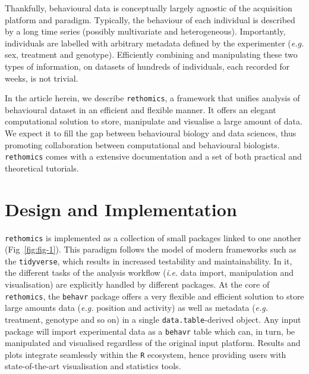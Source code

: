 \documentclass[10pt,letterpaper]{article}\usepackage[]{graphicx}\usepackage[]{color}
\begin{document}
Thankfully, behavioural data is conceptually largely agnostic of the acquisition platform and paradigm. 	
Typically, the behaviour of each individual is described by a long time series (possibly multivariate and heterogeneous).
Importantly, individuals are labelled with arbitrary metadata defined by the experimenter (\emph{e.g.} sex, treatment and genotype).
Efficiently combining and manipulating these two types of information, on datasets of hundreds of individuals, each recorded for weeks, is not trivial.

In the article herein, we describe \texttt{rethomics}, a framework that unifies analysis of behavioural dataset in an efficient and flexible manner.
It offers an elegant computational solution to store, manipulate and visualise a large amount of data.
We expect it to fill the gap between behavioural biology and data sciences, thus promoting collaboration between computational and behavioural biologists.
\texttt{rethomics} comes with a extensive documentation and a set of both practical and theoretical tutorials.


\section*{Design and Implementation}

\texttt{rethomics} is implemented as a collection of small packages linked to one another (Fig~\ref{fig:fig-1}).
This paradigm follows the model of modern frameworks such as the \texttt{tidyverse}, which results in increased testability and maintainability.
In it, the different tasks of the analysis workflow (\emph{i.e.} data import, manipulation and visualisation)
are explicitly handled by different packages.
At the core of \texttt{rethomics}, the \texttt{behavr} package offers a very flexible and efficient solution to store large amounts data (\emph{e.g.} position and activity) as well as metadata (\emph{e.g.} treatment, genotype and so on) in a single \texttt{data.table}-derived object.
Any input package will import experimental data as a \texttt{behavr} table which can, in turn, be manipulated and visualised regardless of the original input platform.
Results and plots integrate seamlessly within the \texttt{R} ecosystem, hence providing users with state-of-the-art visualisation and statistics tools.

\end{document}
